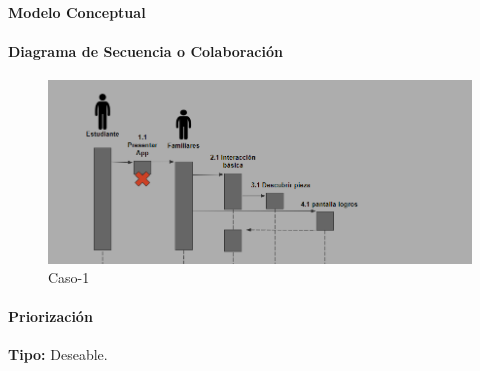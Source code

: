 \paragraph{Modelo Conceptual}


\paragraph{Diagrama de Secuencia o Colaboración}

\begin{figure}[H]
\centerline{\includegraphics[width=15cm]{imgs/CasoUso_7_2.PNG}}
\caption{Caso-1}
\label{fig}
\end{figure}

\paragraph{Priorización}
{\textbf {Tipo:}}
Deseable.